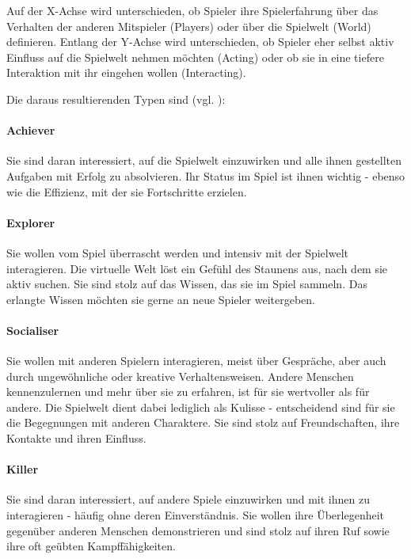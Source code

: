 Auf der X-Achse wird unterschieden, ob Spieler ihre Spielerfahrung über das Verhalten der anderen Mitspieler (Players) oder über die Spielwelt (World) definieren. Entlang der Y-Achse wird unterschieden, ob Spieler eher selbst aktiv Einfluss auf die Spielwelt nehmen möchten (Acting) oder ob sie in eine tiefere Interaktion mit ihr eingehen wollen (Interacting).

Die daraus resultierenden Typen sind (vgl. \citealp{bartle_hearts_1996}):
\paragraph{Achiever}
Sie sind daran interessiert, auf die Spielwelt einzuwirken und alle ihnen gestellten Aufgaben mit Erfolg zu absolvieren. Ihr Status im Spiel ist ihnen wichtig - ebenso wie die Effizienz, mit der sie Fortschritte erzielen.

\paragraph{Explorer}
Sie wollen vom Spiel überrascht werden und intensiv mit der Spielwelt interagieren. Die virtuelle Welt löst ein Gefühl des Staunens aus, nach dem sie aktiv suchen. Sie sind stolz auf das Wissen, das sie im Spiel sammeln. Das erlangte Wissen möchten sie gerne an neue Spieler weitergeben.

\paragraph{Socialiser}
Sie wollen mit anderen Spielern interagieren, meist über Gespräche, aber auch durch ungewöhnliche oder kreative Verhaltensweisen. Andere Menschen kennenzulernen und mehr über sie zu erfahren, ist für sie wertvoller als für andere. Die Spielwelt dient dabei lediglich als Kulisse - entscheidend sind für sie die Begegnungen mit anderen Charaktere. Sie sind stolz auf Freundschaften, ihre Kontakte und ihren Einfluss.

\paragraph{Killer}
Sie sind daran interessiert, auf andere Spiele einzuwirken und mit ihnen zu interagieren - häufig ohne deren Einverständnis. Sie wollen ihre Überlegenheit gegenüber anderen Menschen demonstrieren und sind stolz auf ihren Ruf sowie ihre oft geübten Kampffähigkeiten.

